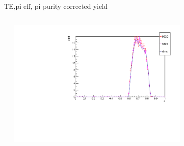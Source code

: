 \begin{frame}{TE,pi eff, pi purity corrected yield}
\begin{columns}
\begin{column}[T]{0.5\textwidth}
\end{column}
\begin{column}[T]{0.5\textwidth}
\includegraphics[width = 0.7\textwidth]{results/yield/check/yieldcheck_70_pos.pdf}
\end{column}
\end{columns}
\end{frame}
